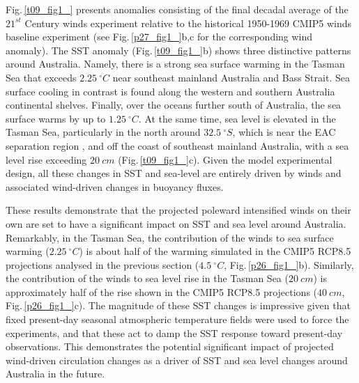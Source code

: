 \documentclass[draft,linenumbers]{agujournal2018}
\begin{document}
Fig.\,\ref{t09_fig1_} presents anomalies consisting of the final decadal average of the $21^{st}$ Century winds experiment relative to the historical 1950-1969 CMIP5 winds baseline experiment (see Fig.\,\ref{p27_fig1_}b,c for the corresponding wind anomaly). The SST anomaly (Fig.\,\ref{t09_fig1_}b) shows three distinctive patterns around Australia. Namely, there is a strong sea surface warming in the Tasman Sea that exceeds $2.25\ ^{\circ}C$ near southeast mainland Australia and Bass Strait. Sea surface cooling in contrast is found along the western and southern Australia continental shelves. Finally, over the oceans further south of Australia, the sea surface warms by up to $1.25\ ^{\circ}C$. At the same time, sea level is elevated in the Tasman Sea, particularly in the north around $32.5\ ^{\circ}S$, which is near the EAC separation region \citep{Godfrey1980}, and off the coast of southeast mainland Australia, with a sea level rise exceeding $20\ cm$ (Fig.\,\ref{t09_fig1_}c). Given the model experimental design, all these changes in SST and sea-level are entirely driven by winds and associated wind-driven changes in buoyancy fluxes.

These results demonstrate that the projected poleward intensified winds on their own are set to have a significant impact on SST and sea level around Australia. Remarkably, in the Tasman Sea, the contribution of the winds to sea surface warming ($2.25\ ^{\circ}C$) is about half of the warming simulated in the CMIP5 RCP8.5 projections analysed in the previous section ($4.5\ ^{\circ}C$, Fig.\,\ref{p26_fig1_}b). Similarly, the contribution of the winds to sea level rise in the Tasman Sea ($20\ cm$) is approximately half of the rise shown in the CMIP5 RCP8.5 projections ($40\ cm$, Fig.\,\ref{p26_fig1_}c). The magnitude of these SST changes is impressive given that fixed present-day seasonal atmospheric temperature fields were used to force the experiments, and that these act to damp the SST response toward present-day observations. This demonstrates the potential significant impact of projected wind-driven circulation changes as a driver of SST and sea level changes around Australia in the future.
\end{document}
